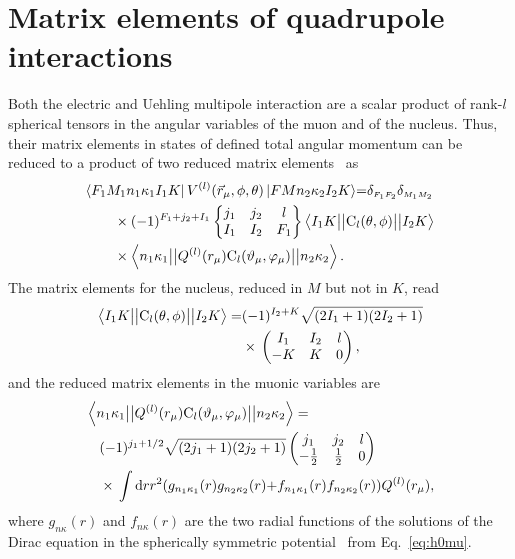 \section{Matrix elements of quadrupole interactions}
\label{sec:mat}
Both the electric and Uehling multipole interaction are a scalar product of rank-$l$ spherical tensors in the angular variables of the muon and of the nucleus. Thus, their matrix elements in states of defined total angular momentum can be reduced to a product of two reduced matrix elements~\cite{varshalovich1988} as
\begin{align}
&{\left< F_1M_1n_1\kappa_1I_1K\right|V^{(l)}(\vec{r}_\mu,\phi,\theta)\left|FMn_2\kappa_2I_2K\right>} {=}
{\delta_{\scriptscriptstyle F_1F_2}\delta_{\scriptscriptstyle M_1M_2}}\notag\\
&\qquad\times(-1)^{F_1+j_2+I_1}
\left\{
\begin{matrix}
j_1&j_2&l\\
I_1&I_2&F_1
\end{matrix}
\right\}\left< I_1K\big{|}\big{|}\text{C}_l(\theta,\phi)\big{|}\big{|}I_2K\right>\notag\\
&\qquad\times \left< n_1\kappa_1\big{|}\big{|}Q^{(l)}(r_\mu)\text{C}_l(\vartheta_\mu,\varphi_\mu) \big{|}\big{|}n_2\kappa_2\right>.\label{eq:matel}
\end{align}
The matrix elements for the nucleus, reduced in $M$ but not in $K$, read~\cite{brown_carrington}
\begin{align}
\left< I_1K\big{|}\big{|}\text{C}_l(\theta,\phi)\big{|}\big{|}I_2K\right>=&(-1)^{I_2+K}
\sqrt{(2I_1+1)(2I_2+1)}\notag\\
&\times\,\left(
\begin{matrix}
I_1&I_2&l\\
-K&K&0
\end{matrix}
\right),
\end{align}
and the reduced matrix elements in the muonic variables are~\cite{johnson2007}
\begin{align}
&\left< n_1\kappa_1\big{|}\big{|}Q^{(l)}(r_\mu)\text{C}_l(\vartheta_\mu,\varphi_\mu) \big{|}\big{|}n_2\kappa_2\right> =  \\
&\quad (-1)^{j_1+1/2} \sqrt{(2j_1+1)(2j_2+1)}
\left(
\begin{matrix}
j_1&j_2&l\\
-\frac{1}{2}&\frac{1}{2}&0
\end{matrix}
\right)\notag\\
&\quad\times\,
\int \text{d}rr^2 ({g_{n_1\kappa_1}(r)g_{n_2\kappa_2}(r)}{+}{f_{n_1\kappa_1}(r)f_{n_2\kappa_2}(r)}) Q^{(l)}(r_\mu),\notag
\end{align}
where $g_{n\kappa}(r)$ and $f_{n\kappa}(r)$ are the two radial functions of the solutions of the Dirac equation in the spherically symmetric potential~\cite{greiner2000} from Eq.~\eqref{eq:h0mu}.






